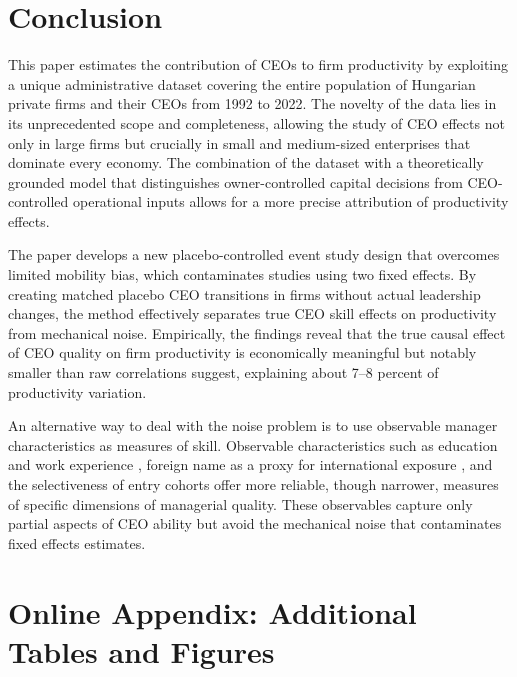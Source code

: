 \documentclass[11pt,a4paper]{article}
\begin{document}
\section{Conclusion}

This paper estimates the contribution of CEOs to firm productivity by exploiting a unique administrative dataset covering the entire population of Hungarian private firms and their CEOs from 1992 to 2022. The novelty of the data lies in its unprecedented scope and completeness, allowing the study of CEO effects not only in large firms but crucially in small and medium-sized enterprises that dominate every economy. The combination of the dataset with a theoretically grounded model that distinguishes owner-controlled capital decisions from CEO-controlled operational inputs allows for a more precise attribution of productivity effects. 

The paper develops a new placebo-controlled event study design that overcomes limited mobility bias, which contaminates studies using two fixed effects.  By creating matched placebo CEO transitions in firms without actual leadership changes, the method effectively separates true CEO skill effects on productivity from mechanical noise. Empirically, the findings reveal that the true causal effect of CEO quality on firm productivity is economically meaningful but notably smaller than raw correlations suggest, explaining about 7–8 percent of productivity variation. 

An alternative way to deal with the noise problem is to use observable manager characteristics as measures of skill. Observable characteristics such as education and work experience \citep{DePirro2025}, foreign name as a proxy for international exposure \citep{Koren2023expat}, and the selectiveness of entry cohorts \citep{koren2024managers} offer more reliable, though narrower, measures of specific dimensions of managerial quality. These observables capture only partial aspects of CEO ability but avoid the mechanical noise that contaminates fixed effects estimates.

\clearpage



\clearpage
\appendix
\section{Online Appendix: Additional Tables and Figures}
\renewcommand{\thefigure}{A\arabic{figure}}
\renewcommand{\thetable}{A\arabic{table}}
\setcounter{figure}{0}
\setcounter{table}{0}






%


\end{document}

